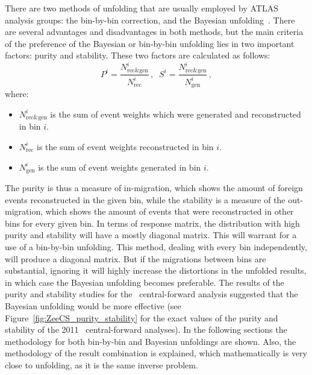 There are two methods of unfolding that are usually employed by ATLAS analysis groups: the bin-by-bin correction, and the Bayesian unfolding~\cite{lib:zcs_unfolding}. There are several advantages and disadvantages in both methods, but the main criteria of the preference of the Bayesian or bin-by-bin unfolding lies in two important factors: purity and stability. These two factors are calculated as follows:
\begin{equation}
P^{i} = \frac{N^{i}_{\text{rec\&gen}} }{ N^{i}_{\text{rec}} }\,, \; \;
S^{i} = \frac{N^{i}_{\text{rec\&gen}} }{ N^{i}_{\text{gen}} }\,,
\end{equation}
where:
\begin{itemize}
\item {\bfseries $N^i_{\text{rec\&gen}}$} is the sum of event weights which were generated and reconstructed in bin $i$.
\item {\bfseries $N^i_{\text{rec}}$} is the sum of event weights reconstructed in bin $i$.
\item {\bfseries $N^i_{\text{gen}}$} is the sum of event weights generated in bin $i$.
\end{itemize}

The purity is thus a measure of in-migration, which shows the amount of foreign events reconstructed in the given bin, while the stability is a measure of the out-migration, which shows the amount of events that were reconstructed in other bins for every given bin. In terms of response matrix, the distribution with high purity and stability will have a mostly diagonal matrix. This will warrant for a use of a bin-by-bin unfolding. This method, dealing with every bin independently, will produce a diagonal matrix. But if the migrations between bins are substantial, ignoring it will highly increase the distortions in the unfolded results, in which case the Bayesian unfolding becomes preferable. The results of the purity and stability studies for the \Zee\ central-forward analysis suggested that the Bayesian unfolding would be more effective (see Figure~\ref{fig:ZeeCS_purity_stability} for the exact values of the purity and stability of the 2011 \Zee\ central-forward analyses). In the following sections the methodology for both bin-by-bin and Bayesian unfoldings are shown. Also, the methodology of the result combination is explained, which mathematically is very close to unfolding, as it is the same inverse problem.

